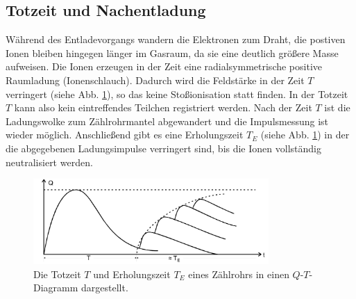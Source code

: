 \subsection{Totzeit und Nachentladung}
Während des Entladevorgangs wandern die Elektronen zum Draht, die postiven Ionen bleiben hingegen länger im Gasraum, da sie eine deutlich größere Masse aufweisen.
Die Ionen erzeugen in der Zeit eine radialsymmetrische positive Raumladung (Ionenschlauch).
Dadurch wird die Feldstärke in der Zeit $T$ verringert (siehe Abb. \ref{fig:totzeit}), so das keine Stoßionisation statt finden.
In der Totzeit $T$ kann also kein eintreffendes Teilchen registriert werden.
Nach der Zeit $T$ ist die Ladungswolke zum Zählrohrmantel abgewandert und die Impulsmessung ist wieder möglich.
Anschließend gibt es eine Erholungszeit $T_E$ (siehe Abb. \ref{fig:totzeit}) in der die abgegebenen Ladungsimpulse verringert sind, bis die Ionen vollständig neutralisiert werden.
\begin{figure}
    \centering
    \includegraphics[width=0.8\textwidth]{content/data/totzeit.jpg}
    \caption{Die Totzeit $T$ und Erholungszeit $T_E$ eines Zählrohrs in einen $Q$-$T$-Diagramm dargestellt. \cite[4]{anleitung}}
    \label{fig:totzeit}
\end{figure}

